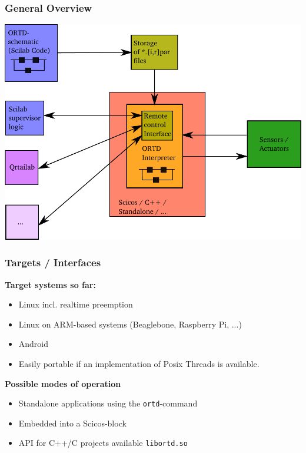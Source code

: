 \documentclass[serif,9pt,xcolor=dvipsnames]{beamer}
\begin{document}
\begin{frame}

 \frametitle{General Overview}



\includegraphics[trim=0mm 0mm 0mm 0mm, clip,width=0.95\linewidth]{../pictures/ortd_principle.pdf}

\end{frame}



\begin{frame}
\frametitle{Targets / Interfaces}

\textbf{Target systems so far:}
\begin{itemize}
 \item Linux incl. realtime preemption
 \item Linux on ARM-based systems (Beaglebone, Raspberry Pi, ...)
 \item Android
 \item Easily portable if an implementation of Posix Threads is available.
\end{itemize}


\textbf{Possible modes of operation}
  \begin{itemize}
   \item Standalone applications using the \texttt{ortd}-command
   \item Embedded into a Scicos-block
   \item API for C++/C projects available { \texttt{libortd.so} }
  \end{itemize}

\end{frame}
\end{document}
